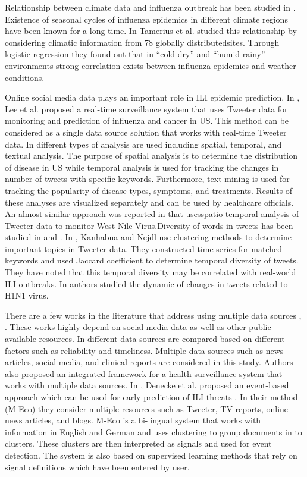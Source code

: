 Relationship between climate data and influenza outbreak has been studied in \cite{ref9}. Existence of seasonal cycles of influenza epidemics in different climate regions have been known for a long time. In \cite{ref9} Tamerius et al. studied this relationship by considering climatic information from 78 globally distributedsites. Through logistic regression they found out that in “cold-dry” and “humid-rainy” environments strong correlation exists between influenza epidemics and weather conditions.

Online social media data plays an important role in ILI epidemic prediction. In \cite{ref4}, Lee et al. proposed a real-time surveillance system that uses Tweeter data for monitoring and prediction of influenza and cancer in US. This method can be considered as a single data source solution that works with real-time Tweeter data. In \cite{ref4} different types of analysis are used including spatial, temporal, and textual analysis. The purpose of spatial analysis is to determine the distribution of disease in US while temporal analysis is used for tracking the changes in number of tweets with specific keywords. Furthermore, text mining is used for tracking the popularity of disease types, symptoms, and treatments. Results of these analyses are visualized separately and can be used by healthcare officials. An almost similar approach was reported in \cite{ref7} that usesspatio-temporal analysis of Tweeter data to monitor West Nile Virus.Diversity of words in tweets has been studied in \cite{ref5} and \cite{ref6} . In \cite{ref5}, Kanhabua and Nejdl use clustering methods to determine important topics in Tweeter data. They constructed time series for matched keywords and used Jaccard coefficient to determine temporal diversity of tweets. They have noted that this temporal diversity may be correlated with real-world ILI outbreaks. In \cite{ref6} authors studied the dynamic of changes in tweets related to H1N1 virus.

There are a few works in the literature that address using multiple data sources \cite{ref10}, \cite{ref3}. These works highly depend on social media data as well as other public available resources. In \cite{ref10} different data sources are compared based on different factors such as reliability and timeliness. Multiple data sources such as news articles, social media, and clinical reports are considered in this study. Authors also proposed an integrated framework for a health surveillance system that works with multiple data sources. In \cite{ref3}, Denecke et al. proposed an event-based approach which can be used for early prediction of ILI threats \cite{ref3}. In their method (M-Eco) they consider multiple resources such as Tweeter, TV reports, online news articles, and blogs. M-Eco is a bi-lingual system that works with information in English and German and uses clustering to group documents in to clusters. These clusters are then interpreted as signals and used for event detection. The system is also based on supervised learning methods that rely on signal definitions which have been entered by user.

